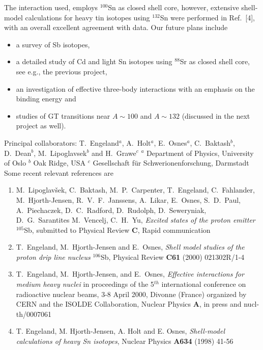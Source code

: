 The interaction used, employs $^{100}$Sn as closed shell core,
however, extensive shell-model calculations for heavy tin isotopes
using $^{132}$Sn were performed in Ref.~[4], with an overall 
excellent
agreement with data. Our future plans include
\begin{itemize} 
\item a survey of Sb isotopes,
\item a detailed study of Cd and light Sn isotopes using 
      $^{88}$Sr as closed shell core, see e.g., the previous project,
\item an investigation of effective three-body interactions 
      with an emphasis on the binding energy and 
\item studies of GT transitions near $A\sim 100$ and $A\sim 132$
      (discussed in the next project as well).
\end{itemize}     
Principal collaborators: T.\ Engeland$^a$, 
A.\ Holt$^a$, E.\ Osnes$^a$, 
C.\ Baktash$^b$, D.\ Dean$^b$, M.\ Lipoglavsek$^b$ 
and H.\ Grawe$^c$\newline
${}^a$ Department of Physics,
University of Oslo\newline
${}^b$ Oak Ridge, USA\newline
${}^c$ Gesellschaft f\"ur Schwerionenforschung,
Darmstadt\newline\newline
Some recent relevant references are
\begin{enumerate}
\item 
M.~Lipoglav\v{s}ek, C.~Baktash,
M.~P.~Carpenter, T.~Engeland, C.~Fahlander,
M.~Hjorth-Jensen, R.~V.~F.~Janssens, A.~Likar,
E.~Osnes, S.~D.~Paul, A.~Piechaczek, D.~C.~Radford,
D.~Rudolph, D.~Seweryniak, D.~G.~Sarantites M.~Vencelj, C.~H.~Yu,
{\em Excited states of the proton emitter} $^{105}$Sb, submitted
to Physical Review {\bf C}, Rapid communication



\item T.~Engeland, M.~Hjorth-Jensen and E.~Osnes,
    {\em Shell model studies of the proton drip line nucleus} $^{106}$Sb,
    Physical Review {\bf C61} (2000) 021302R/1-4
\item T.~Engeland, M.\ Hjorth-Jensen, and E.~Osnes, {\em  Effective interactions for medium heavy nuclei}
in 
      proceedings of the
      5$^{th}$ international conference on radioactive nuclear beams, 3-8
       April 2000, Divonne (France) organized by CERN and the ISOLDE Collaboration,
       Nuclear Physics {\bf A}, in press and nucl-th/0007061

 \item
    T. Engeland, M. Hjorth-Jensen, A. Holt and E. Osnes,
    {\em Shell-model calculations of heavy Sn isotopes},
    Nuclear Physics {\bf A634} (1998) 41-56

\end{enumerate}




